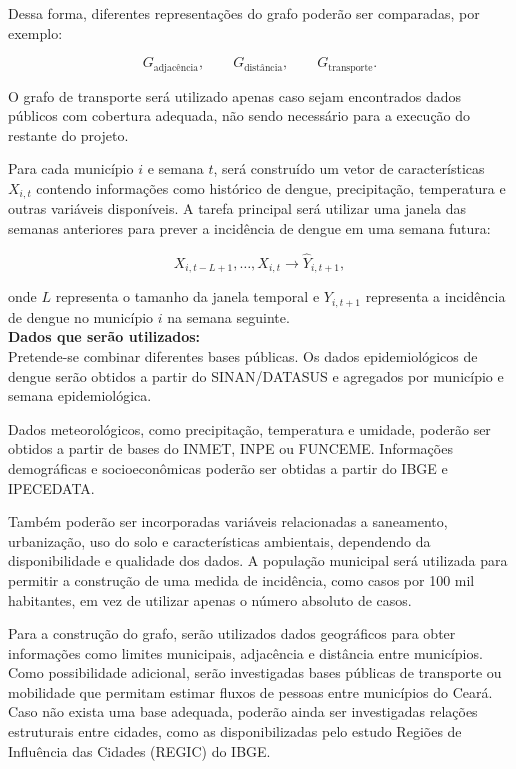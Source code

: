 \documentclass{article}
\begin{document}
Dessa forma, diferentes representações do grafo poderão ser comparadas, por exemplo:

\[
G_{\text{adjacência}}, \qquad
G_{\text{distância}}, \qquad
G_{\text{transporte}}.
\]

O grafo de transporte será utilizado apenas caso sejam encontrados dados públicos com cobertura adequada, não sendo necessário para a execução do restante do projeto.

Para cada município $i$ e semana $t$, será construído um vetor de características $X_{i,t}$ contendo informações como histórico de dengue, precipitação, temperatura e outras variáveis disponíveis. A tarefa principal será utilizar uma janela das semanas anteriores para prever a incidência de dengue em uma semana futura:

\[
X_{i,t-L+1}, \ldots, X_{i,t}
\longrightarrow
\hat{Y}_{i,t+1},
\]

onde $L$ representa o tamanho da janela temporal e $Y_{i,t+1}$ representa a incidência de dengue no município $i$ na semana seguinte. \\

\textbf{Dados que serão utilizados:} \\
Pretende-se combinar diferentes bases públicas. Os dados epidemiológicos de dengue serão obtidos a partir do SINAN/DATASUS e agregados por município e semana epidemiológica.

Dados meteorológicos, como precipitação, temperatura e umidade, poderão ser obtidos a partir de bases do INMET, INPE ou FUNCEME. Informações demográficas e socioeconômicas poderão ser obtidas a partir do IBGE e IPECEDATA.

Também poderão ser incorporadas variáveis relacionadas a saneamento, urbanização, uso do solo e características ambientais, dependendo da disponibilidade e qualidade dos dados. A população municipal será utilizada para permitir a construção de uma medida de incidência, como casos por 100 mil habitantes, em vez de utilizar apenas o número absoluto de casos.

Para a construção do grafo, serão utilizados dados geográficos para obter informações como limites municipais, adjacência e distância entre municípios. Como possibilidade adicional, serão investigadas bases públicas de transporte ou mobilidade que permitam estimar fluxos de pessoas entre municípios do Ceará. Caso não exista uma base adequada, poderão ainda ser investigadas relações estruturais entre cidades, como as disponibilizadas pelo estudo Regiões de Influência das Cidades (REGIC) do IBGE. \\
\end{document}
